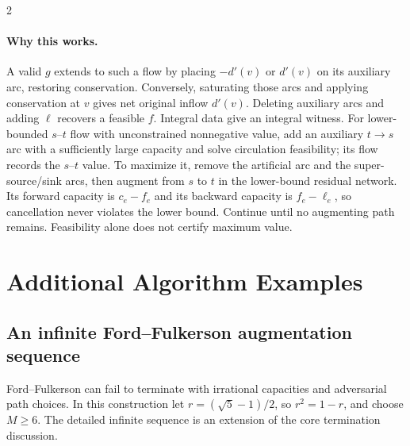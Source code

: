 \documentclass[10pt]{article}
\theoremstyle{definition}
\begin{document}
\begin{multicols*}{2}
\paragraph{Why this works.}
A valid $g$ extends to such a flow by placing $-d'(v)$ or $d'(v)$ on its
auxiliary arc, restoring conservation. Conversely, saturating those arcs
and applying conservation at $v$ gives net original inflow $d'(v)$.
Deleting auxiliary arcs and adding $\ell$ recovers a feasible $f$.
Integral data give an integral witness. For lower-bounded $s$--$t$ flow with
unconstrained nonnegative value, add an auxiliary $t\to s$ arc with a
sufficiently large capacity and solve circulation feasibility; its flow
records the $s$--$t$ value. To maximize it, remove the artificial arc and the
super-source/sink arcs, then augment from $s$ to $t$ in the lower-bound residual
network. Its forward capacity is $c_e-f_e$ and its backward capacity is
$f_e-\ell_e$, so cancellation never violates the lower bound. Continue until no
augmenting path remains. Feasibility alone does not certify maximum value.


\clearpage

\section{Additional Algorithm Examples}\label{app:extra}
\subsection{An infinite Ford--Fulkerson augmentation sequence}
Ford--Fulkerson can fail to terminate with irrational capacities and adversarial path choices.
In this construction let $r=(\sqrt5-1)/2$, so $r^2=1-r$, and choose $M\ge6$.
The detailed infinite sequence is an extension of the core termination discussion.


\begin{figure}[H]
\centering

\end{figure}
\end{multicols*}
\end{document}

